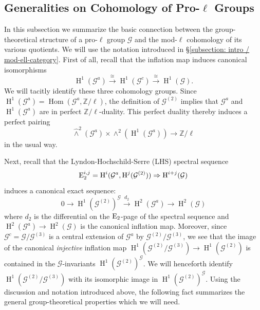 \documentclass[11pt]{amsart}
\theoremstyle{definition}
\theoremstyle{remark}
\numberwithin{equation}{section}
\renewcommand{\H}{\operatorname{H}}
\DeclareMathOperator{\Hom}{Hom}
\newcommand{\Z}{\mathbb{Z}}
\newcommand{\Gc}{\mathcal{G}}
\begin{document}
\subsection{Generalities on Cohomology of Pro-$\ell$ Groups}
\label{subsection: cohom / generalities}

In this subsection we summarize the basic connection between the group-theoretical structure of a pro-$\ell$ group $\Gc$ and the mod-$\ell$ cohomology of its various quotients.
We will use the notation introduced in \S\ref{subsection: intro / mod-ell-category}.
First of all, recall that the inflation map induces canonical isomorphisms
\[ \H^1(\Gc^a) \xrightarrow{\cong} \H^1(\Gc^c) \xrightarrow{\cong} \H^1(\Gc). \]
We will tacitly identify these three cohomology groups.
Since $\H^1(\Gc^a) = \Hom(\Gc^a,\Z/\ell)$, the definition of $\Gc^{(2)}$ implies that $\Gc^a$ and $\H^1(\Gc^a)$ are in perfect $\Z/\ell$-duality.
This perfect duality thereby induces a perfect pairing
\[ \widehat\wedge^2(\Gc^a) \times \wedge^2(\H^1(\Gc^a)) \rightarrow \Z/\ell \]
in the usual way.

Next, recall that the Lyndon-Hochschild-Serre (LHS) spectral sequence
\[ {\rm E}_2^{i,j} = \H^i(\Gc^a,\H^j(\Gc^{(2)})) \Rightarrow \H^{i+j}(\Gc) \]
induces a canonical exact sequence:
\[ 0 \rightarrow \H^1(\Gc^{(2)})^\Gc \xrightarrow{d_2} \H^2(\Gc^a) \rightarrow \H^2(\Gc) \]
where $d_2$ is the differential on the ${\rm E}_2$-page of the spectral sequence and $\H^2(\Gc^a) \rightarrow \H^2(\Gc)$ is the canonical inflation map.
Moreover, since $\Gc^c = \Gc/\Gc^{(3)}$ is a central extension of $\Gc^a$ by $\Gc^{(2)}/\Gc^{(3)}$, we see that the image of the canonical \emph{injective} inflation map $\H^1(\Gc^{(2)}/\Gc^{(3)}) \rightarrow \H^1(\Gc^{(2)})$ is contained in the $\Gc$-invariants $\H^1(\Gc^{(2)})^\Gc$.
We will henceforth identify $\H^1(\Gc^{(2)}/\Gc^{(3)})$ with its isomorphic image in $\H^1(\Gc^{(2)})^\Gc$.
Using the discussion and notation introduced above, the following fact summarizes the general group-theoretical properties which we will need.
\end{document}
